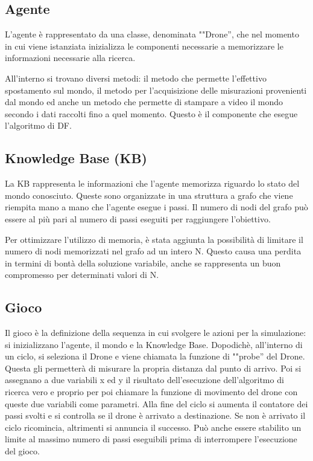 \subsection{Agente}
L'agente è rappresentato da una classe, denominata ""Drone'', che nel momento in cui viene istanziata inizializza le componenti necessarie a memorizzare le informazioni necessarie alla ricerca. 

All'interno si trovano diversi metodi: il metodo che permette l'effettivo spostamento sul mondo, il metodo per l'acquisizione delle misurazioni provenienti dal mondo ed anche un metodo che permette di stampare a video il mondo secondo i dati raccolti fino a quel momento. Questo è il componente che esegue l'algoritmo di DF.

\subsection{Knowledge Base (KB)}
La KB rappresenta le informazioni che l'agente memorizza riguardo lo stato del mondo conosciuto. Queste sono organizzate in una struttura a grafo che viene riempita mano a mano che l'agente esegue i passi. Il numero di nodi del grafo può essere al più pari al numero di passi eseguiti per raggiungere l'obiettivo. 

Per ottimizzare l'utilizzo di memoria, è stata aggiunta la possibilità di limitare il numero di nodi memorizzati nel grafo ad un intero N. Questo causa una perdita in termini di bontà della soluzione variabile, anche se rappresenta un buon compromesso per determinati valori di N.

\subsection{Gioco}
Il gioco è la definizione della sequenza in cui svolgere le azioni per la simulazione: si inizializzano l'agente, il mondo e la Knowledge Base. Dopodichè, all'interno di un ciclo, si seleziona il Drone e viene chiamata la funzione di ""probe'' del Drone. Questa gli permetterà di misurare la propria distanza dal punto di arrivo. Poi si assegnano a due variabili x ed y il risultato dell'esecuzione dell'algoritmo di ricerca vero e proprio per poi chiamare la funzione di movimento del drone con queste due variabili come parametri. Alla fine del ciclo si aumenta il contatore dei passi svolti e si controlla se il drone è arrivato a destinazione. Se non è arrivato il ciclo ricomincia, altrimenti si annuncia il successo. Può anche essere stabilito un limite al massimo numero di passi eseguibili prima di interrompere l'esecuzione del gioco.
	
